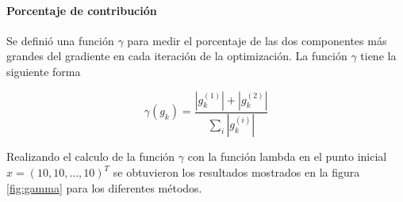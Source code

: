 \begin{frame}{\insertsectionhead}
    \framesubtitle{Porcentaje de contribución}
    Se definió una función $\gamma$ para medir el porcentaje de las dos componentes más grandes del gradiente en cada iteración de la optimización. La función $\gamma$ tiene la siguiente forma

    \begin{equation*}
        \gamma(g_k) = \frac{|g_k^{(1)}|+|g_k^{(2)}|}{\sum\limits_i |g_k^{(i)}|}
    \end{equation*}

    Realizando el calculo de la función $\gamma$ con la función lambda en el punto inicial $x=(10,10,\dots,10)^T$ se obtuvieron los resultados mostrados en la figura \ref{fig:gamma} para los diferentes métodos.
\end{frame}

